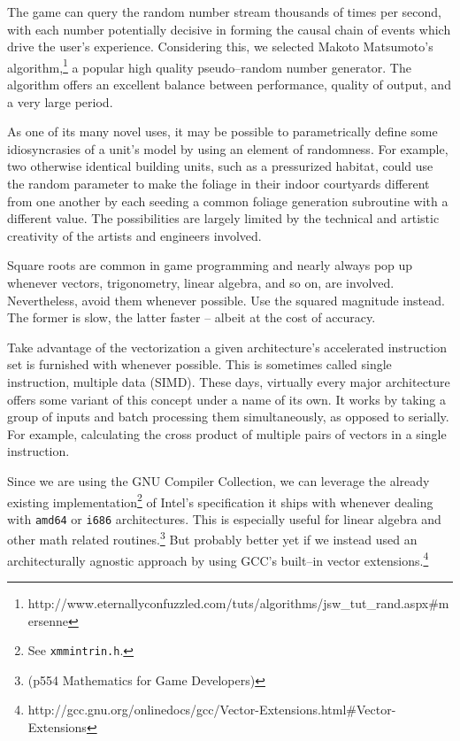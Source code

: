 The game can query the random number stream thousands of times per second, with each number potentially decisive in forming the causal chain of events which drive the user's experience. Considering this, we selected Makoto Matsumoto's algorithm,\footnote{http://www.eternallyconfuzzled.com/tuts/algorithms/jsw_tut_rand.aspx\#mersenne} a popular high quality pseudo--random number generator. The algorithm offers an excellent balance between performance, quality of output, and a very large period.

As one of its many novel uses, it may be possible to parametrically define some idiosyncrasies of a unit's model by using an element of randomness. For example, two otherwise identical building units, such as a pressurized habitat, could use the random parameter to make the foliage in their indoor courtyards different from one another by each seeding a common foliage generation subroutine with a different value. The possibilities are largely limited by the technical and artistic creativity of the artists and engineers involved.

Square roots are common in game programming and nearly always pop up whenever vectors, trigonometry, linear algebra, and so on, are involved. Nevertheless, avoid them whenever possible. Use the squared magnitude instead. The former is slow, the latter faster -- albeit at the cost of accuracy.

Take advantage of the vectorization a given architecture's accelerated instruction set is furnished with whenever possible. This is sometimes called single instruction, multiple data (SIMD). These days, virtually every major architecture offers some variant of this concept under a name of its own. It works by taking a group of inputs and batch processing them simultaneously, as opposed to serially. For example, calculating the cross product of multiple pairs of vectors in a single instruction.

Since we are using the GNU Compiler Collection, we can leverage the already existing implementation\footnote{See {\tt xmmintrin.h}.} of Intel's specification it ships with whenever dealing with {\tt amd64} or {\tt i686} architectures. This is especially useful for linear algebra and other math related routines.\footnote{(p554 Mathematics for Game Developers)} But probably better yet if we instead used an architecturally agnostic approach by using GCC's built--in vector extensions.\footnote{http://gcc.gnu.org/onlinedocs/gcc/Vector-Extensions.html\#Vector-Extensions}


